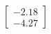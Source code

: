 \documentclass[preview]{standalone}
\begin{document}
\begin{align*}
\begin{bmatrix} -2.18 \\ -4.27 \end{bmatrix}
\end{align*}
\end{document}
